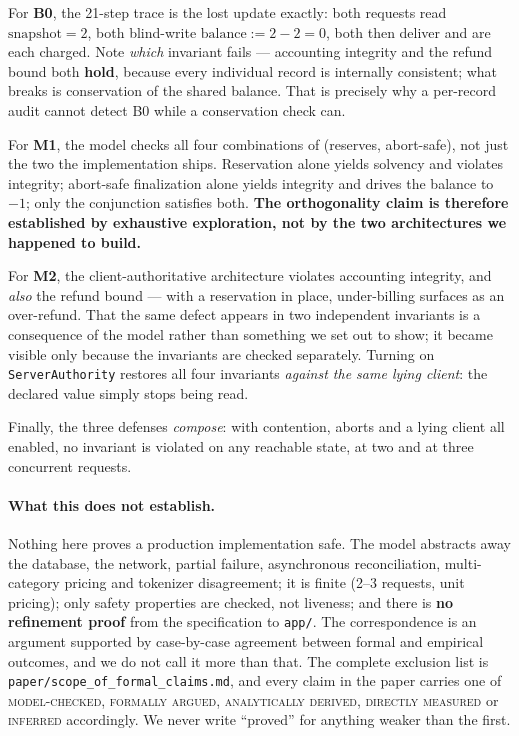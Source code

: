\documentclass[11pt]{article}
\begin{document}
For \textbf{B0}, the 21-step trace is the lost update exactly: both requests read
$\mathrm{snapshot}=2$, both blind-write $\mathrm{balance}:=2-2=0$, both then deliver and
are each charged. Note \emph{which} invariant fails --- accounting integrity and the
refund bound both \textbf{hold}, because every individual record is internally consistent;
what breaks is conservation of the shared balance. That is precisely why a per-record
audit cannot detect B0 while a conservation check can.

For \textbf{M1}, the model checks all four combinations of (reserves, abort-safe), not
just the two the implementation ships. Reservation alone yields solvency and violates
integrity; abort-safe finalization alone yields integrity and drives the balance to
$-1$; only the conjunction satisfies both. \textbf{The orthogonality claim is therefore
established by exhaustive exploration, not by the two architectures we happened to
build.}

For \textbf{M2}, the client-authoritative architecture violates accounting integrity, and
\emph{also} the refund bound --- with a reservation in place, under-billing surfaces as an
over-refund. That the same defect appears in two independent invariants is a consequence
of the model rather than something we set out to show; it became visible only because the
invariants are checked separately. Turning on \texttt{ServerAuthority} restores all four
invariants \emph{against the same lying client}: the declared value simply stops being
read.

Finally, the three defenses \emph{compose}: with contention, aborts and a lying client all
enabled, no invariant is violated on any reachable state, at two and at three concurrent
requests.

\paragraph{What this does not establish.} Nothing here proves a production implementation
safe. The model abstracts away the database, the network, partial failure, asynchronous
reconciliation, multi-category pricing and tokenizer disagreement; it is finite (2--3
requests, unit pricing); only safety properties are checked, not liveness; and there is
\textbf{no refinement proof} from the specification to \texttt{app/}. The correspondence
is an argument supported by case-by-case agreement between formal and empirical outcomes,
and we do not call it more than that. The complete exclusion list is
\texttt{paper/scope\_of\_formal\_claims.md}, and every claim in the paper carries one of
\textsc{model-checked}, \textsc{formally argued}, \textsc{analytically derived},
\textsc{directly measured} or \textsc{inferred} accordingly. We never write ``proved'' for
anything weaker than the first.
\end{document}
